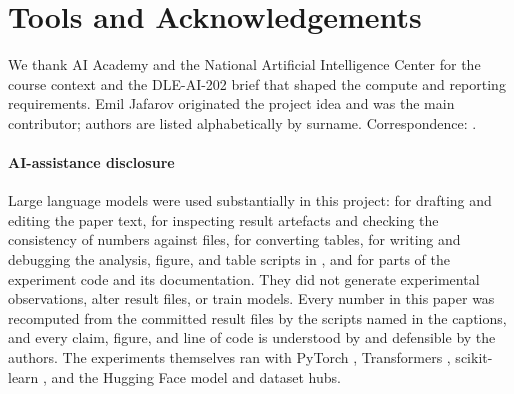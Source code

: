 \section*{Tools and Acknowledgements}
We thank AI Academy and the National Artificial Intelligence Center for the course context and the DLE-AI-202 brief that shaped the compute and reporting requirements. Emil Jafarov originated the project idea and was the main contributor; authors are listed alphabetically by surname. Correspondence: .

\paragraph{AI-assistance disclosure} Large language models were used substantially in this project: for drafting and editing the paper text, for inspecting result artefacts and checking the consistency of numbers against files, for converting tables, for writing and debugging the analysis, figure, and table scripts in , and for parts of the experiment code and its documentation. They did not generate experimental observations, alter result files, or train models. Every number in this paper was recomputed from the committed result files by the scripts named in the captions, and every claim, figure, and line of code is understood by and defensible by the authors. The experiments themselves ran with PyTorch \cite{paszke2019pytorch}, Transformers \cite{wolf2020transformers}, scikit-learn \cite{pedregosa2011sklearn}, and the Hugging Face model and dataset hubs.
